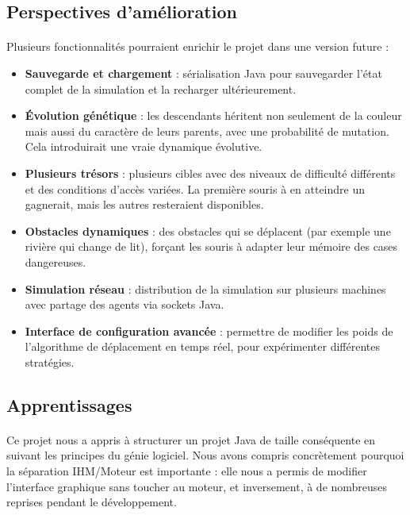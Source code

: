 \bigskip

\subsection{Perspectives d'amélioration}

\paragraph{} Plusieurs fonctionnalités pourraient enrichir le projet dans une version future :

\begin{itemize}
    \item \textbf{Sauvegarde et chargement} : sérialisation Java pour sauvegarder l'état complet de la simulation et la recharger ultérieurement.
    \item \textbf{Évolution génétique} : les descendants héritent non seulement de la couleur mais aussi du caractère de leurs parents, avec une probabilité de mutation. Cela introduirait une vraie dynamique évolutive.
    \item \textbf{Plusieurs trésors} : plusieurs cibles avec des niveaux de difficulté différents et des conditions d'accès variées. La première souris à en atteindre un gagnerait, mais les autres resteraient disponibles.
    \item \textbf{Obstacles dynamiques} : des obstacles qui se déplacent (par exemple une rivière qui change de lit), forçant les souris à adapter leur mémoire des cases dangereuses.
    \item \textbf{Simulation réseau} : distribution de la simulation sur plusieurs machines avec partage des agents via sockets Java.
    \item \textbf{Interface de configuration avancée} : permettre de modifier les poids de l'algorithme de déplacement en temps réel, pour expérimenter différentes stratégies.
\end{itemize}

\bigskip

\subsection{Apprentissages}

\paragraph{} Ce projet nous a appris à structurer un projet Java de taille conséquente en suivant les principes du génie logiciel. Nous avons compris concrètement pourquoi la séparation IHM/Moteur est importante : elle nous a permis de modifier l'interface graphique sans toucher au moteur, et inversement, à de nombreuses reprises pendant le développement.

